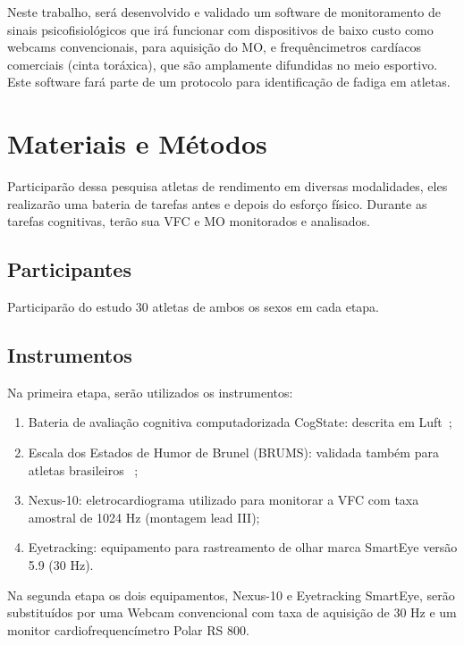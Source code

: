 \documentclass[10pt, conference, compsocconf]{IEEEtran}
\begin{document}
 	Neste trabalho, será desenvolvido e validado um software de monitoramento de sinais psicofisiológicos que irá funcionar com dispositivos de baixo custo como webcams convencionais, para aquisição do MO, e frequêncimetros cardíacos comerciais (cinta toráxica), que são amplamente difundidas no meio esportivo. Este software fará parte de um protocolo para identificação de fadiga em atletas.
 


\section{Materiais e Métodos}
	
	Participarão dessa pesquisa atletas de rendimento em diversas modalidades, eles realizarão uma bateria de tarefas antes e depois do esforço físico. Durante as tarefas cognitivas, terão sua VFC e MO monitorados e analisados. 
	 
\subsection{Participantes}

	Participarão do estudo 30 atletas de ambos os sexos em cada etapa.

\subsection{Instrumentos} 

	Na primeira etapa, serão utilizados os instrumentos: 
	
	\begin{enumerate}
\item Bateria de avaliação cognitiva computadorizada CogState: descrita em Luft~\cite{Luft2009};

\item Escala dos Estados de Humor de Brunel (BRUMS): validada também para atletas brasileiros ~\cite{Rohlfs2008};

\item Nexus-10: eletrocardiograma utilizado para monitorar a VFC com taxa amostral de 1024 Hz (montagem lead III);

\item Eyetracking: equipamento para rastreamento de olhar marca SmartEye versão 5.9 (30 Hz). 

\end{enumerate}
	   
	Na segunda etapa os dois equipamentos, Nexus-10 e Eyetracking SmartEye, serão substituídos por uma Webcam convencional com taxa de aquisição de 30 Hz e um monitor cardiofrequencímetro Polar RS 800.
	 
\end{document}

